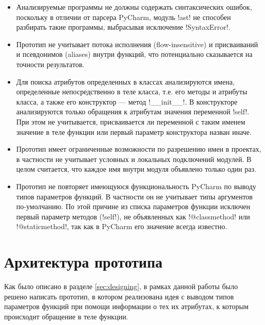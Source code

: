 \begin{itemize} 
  \item Анализируемые программы не должны содержать синтаксических
  ошибок, поскольку в отличии от парсера PyCharm, модуль !ast! не способен
  разбирать такие программы, выбрасывая исключение !SyntaxError!.

  \item Прототип не учитывает потока исполнения (flow-insensitive) и
    присваиваний и псевдонимов (aliases) внутри функций, что потенциально
    сказывается на точности результатов.

  \item Для поиска атрибутов определенных в классах анализируются имена,
    определенные непосредственно в теле класса, т.е. его методы и атрибуты
    класса, а также его конструктор --- метод !__init__!. В конструкторе
    анализируются только обращения к атрибутам значения переменной !self!. 
    При этом не учитывается, присваивается ли переменной с таким именем значение
    в теле функции или первый параметр конструктора назван иначе.

  \item Прототип имеет ограниченные возможности по разрешению имен в проектах, в
    частности не учитывает условных и локальных подключений модулей. В целом
    считается, что каждое имя внутри модуля объявлено только один раз.

  \item Прототип не повторяет имеющуюся функциональность PyCharm по выводу
    типов параметров функций. В частности он не учитывает типы
    аргументов по-умолчанию. По этой причине из списка параметров функции
    исключен первый параметр методов (!self!), не объявленных как !@classmethod!
    или !@staticmethod!, так как в PyCharm его значение всегда известно.

\end{itemize}



\section{Архитектура прототипа}
\label{sec:prototype-architecture}

Как было описано в разделе \ref{sec:designing}, в рамках
данной работы было решено написать прототип, в котором реализована идея с
выводом типов параметров функций при помощи информации о тех их атрибутах, к
которым происходит обращение в теле функции. 

